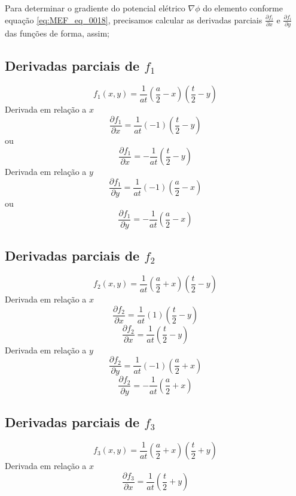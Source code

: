 \documentclass[
12pt,
a4paper,
oneside,
chapter=TITLE,
sumario=tradicional
]{abntex2}
\begin{document}
 Para determinar o gradiente do potencial elétrico $\nabla \phi$ do elemento conforme equação \ref{eq:MEF_eq_0018}, precisamos calcular as derivadas parciais  $\frac{\partial f_i}{\partial x}$ e $\frac{\partial f_i}{\partial y}$ das funções de forma, assim;
 
 \subsection*{Derivadas parciais de $f_1$}
 $$  
 	f_1(x,y)=\frac{1}{at}\left(\frac{a}{2}-x\right)\left(\frac{t}{2} -y\right)
 $$
 Derivada em relação a $x$
 $$  
\frac{\partial f_1}{\partial x} = \frac{1}{at}(-1)\left(\frac{t}{2} - y\right) 
 $$
 ou
 \begin{equation}
 	\frac{\partial f_1}{\partial x} = -\frac{1}{at}\left(\frac{t}{2} - y\right)
 		\label{eq:MEF_eq_0028}  
 \end{equation}
Derivada em relação a $y$
 $$  
\frac{\partial f_1}{\partial y} = \frac{1}{at}(-1)\left(\frac{a}{2} - x\right) 
 $$
 ou
\begin{equation}
	\frac{\partial f_1}{\partial y} = -\frac{1}{at}\left(\frac{a}{2} - x\right) 
		\label{eq:MEF_eq_0029} 
\end{equation}

 \subsection*{Derivadas parciais de $f_2$}
 $$
 	f_2(x,y)=\frac{1}{at}\left(\frac{a}{2}+x\right)\left(\frac{t}{2} -y\right)
 $$
  Derivada em relação a $x$
 $$  
 \frac{\partial f_2}{\partial x} = \frac{1}{at}(1)\left(\frac{t}{2} - y\right) 
 $$
 \begin{equation}
 	 \frac{\partial f_2}{\partial x} = \frac{1}{at}\left(\frac{t}{2} - y\right)
 	 \label{eq:MEF_eq_0030}  
 \end{equation}
 Derivada em relação a $y$
 $$  
 \frac{\partial f_2}{\partial y} = \frac{1}{at}(-1)\left(\frac{a}{2} + x\right) 
 $$
  \begin{equation}
 	\frac{\partial f_2}{\partial y} = -\frac{1}{at}\left(\frac{a}{2} + x\right)
 	\label{eq:MEF_eq_0031}  
 \end{equation}	
  \subsection*{Derivadas parciais de $f_3$}
  $$
  f_3(x,y)=\frac{1}{at}\left(\frac{a}{2}+x\right)\left(\frac{t}{2} + y\right)
  $$
 Derivada em relação a $x$
 \begin{equation}
 	\frac{\partial f_3}{\partial x} = \frac{1}{at}\left(\frac{t}{2} + y\right)
 	\label{eq:MEF_eq_0032} 
 \end{equation}
 
\end{document}
